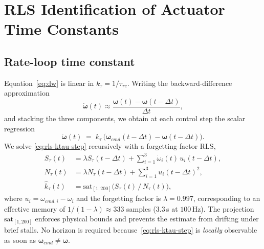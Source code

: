 \documentclass[lettersize,journal]{IEEEtran}
\newcommand{\vect}[1]{\bm{#1}}
\newcommand{\dt}{\Delta t}
\begin{document}
\section{RLS Identification of Actuator Time Constants}\label{sec:rls}

\subsection{Rate-loop time constant}
Equation~\eqref{eq:dw} is linear in $k_\tau=1/\tau_{rc}$.  Writing
the backward-difference approximation
\[
\dot{\vect\omega}(t)\approx \frac{\vect\omega(t)-\vect\omega(t-\dt)}{\dt},
\]
and stacking the three components, we obtain at each control
step the scalar regression
\begin{equation}
\dot{\vect\omega}(t) \;=\; k_\tau\,\big(\vect\omega_{cmd}(t-\dt)-\vect\omega(t-\dt)\big).
\label{eq:rls-ktau-step}
\end{equation}
We solve \eqref{eq:rls-ktau-step} recursively with a
forgetting-factor RLS,
\begin{align}
S_\tau(t) &= \lambda S_\tau(t-\dt) + \sum_{i=1}^3 \dot\omega_i(t)\,u_i(t-\dt), \\
N_\tau(t) &= \lambda N_\tau(t-\dt) + \sum_{i=1}^3 u_i(t-\dt)^2, \\
\hat k_\tau(t) &= \mathrm{sat}_{[1,200]}\big( S_\tau(t)\,/\,N_\tau(t) \big),
\end{align}
where $u_i = \omega_{cmd,i}-\omega_i$ and the forgetting factor
is $\lambda=0.997$, corresponding to an effective memory of
$1/(1-\lambda)\approx 333$ samples ($3.3$\,s at $100$\,Hz).  The
projection $\mathrm{sat}_{[1,200]}$ enforces physical bounds and
prevents the estimate from drifting under brief stalls.  No
horizon is required because~\eqref{eq:rls-ktau-step} is
\emph{locally} observable as soon as
$\vect\omega_{cmd}\neq\vect\omega$.
\end{document}
